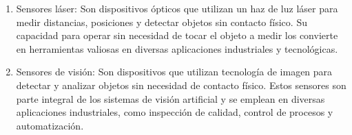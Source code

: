 \begin{enumerate}
\begin{enumerate}
			\begin{figure}[h]
				\centering
				\hfill
			\end{figure}
			\item Sensores láser: Son dispositivos ópticos que utilizan un haz de luz láser para medir distancias, posiciones y detectar objetos sin contacto físico. Su capacidad para operar sin necesidad de tocar el objeto a medir los convierte en herramientas valiosas en diversas aplicaciones industriales y tecnológicas.\cite{Slaser}\\ 
			\begin{figure}[h]
				\centering
				\hfill
			\end{figure}
			\item Sensores de visión: Son dispositivos que utilizan tecnología de imagen para detectar y analizar objetos sin necesidad de contacto físico. Estos sensores son parte integral de los sistemas de visión artificial y se emplean en diversas aplicaciones industriales, como inspección de calidad, control de procesos y automatización.\cite{Svision}\\ 
			\begin{figure}[h]
				\centering
				\hfill
			\end{figure}
		\end{enumerate}
	\end{enumerate}
	
